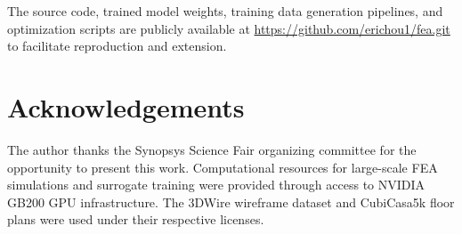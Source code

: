 \documentclass[11pt]{article}
\theoremstyle{plain}
\theoremstyle{definition}
\theoremstyle{remark}
\begin{document}
The source code, trained model weights, training data generation pipelines, and optimization scripts are publicly available at \url{https://github.com/erichou1/fea.git} to facilitate reproduction and extension.


\section*{Acknowledgements}

The author thanks the Synopsys Science Fair organizing committee for the opportunity to present this work. Computational resources for large-scale FEA simulations and surrogate training were provided through access to NVIDIA GB200 GPU infrastructure. The 3DWire wireframe dataset and CubiCasa5k floor plans were used under their respective licenses.
\end{document}
